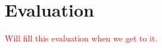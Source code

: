 \section{Evaluation}
\label{sec:evaluation}

\textcolor{red}{Will fill this evaluation when we get to it.}

